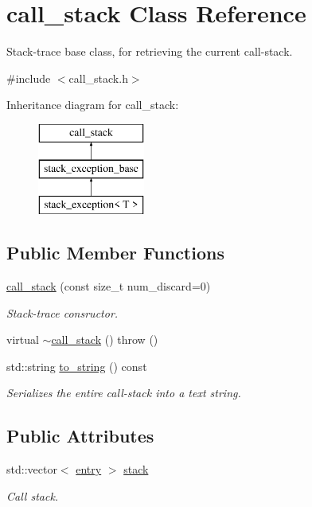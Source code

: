 \hypertarget{classstacktrace_1_1call__stack}{}\section{call\+\_\+stack Class Reference}
\label{classstacktrace_1_1call__stack}


Stack-\/trace base class, for retrieving the current call-\/stack.  




{\ttfamily \#include $<$call\+\_\+stack.\+h$>$}

Inheritance diagram for call\+\_\+stack\+:\begin{figure}[H]
\begin{center}
\leavevmode
\includegraphics[height=3.000000cm]{classstacktrace_1_1call__stack}
\end{center}
\end{figure}
\subsection*{Public Member Functions}
\begin{DoxyCompactItemize}
\item 
\mbox{\hyperlink{classstacktrace_1_1call__stack_a849ac898624b9ee9a0f6f385624243bb}{call\+\_\+stack}} (const size\+\_\+t num\+\_\+discard=0)
\begin{DoxyCompactList}\small\item\em Stack-\/trace consructor. \end{DoxyCompactList}\item 
virtual \mbox{\hyperlink{classstacktrace_1_1call__stack_ad3a052567d850f543c14edadad05a833}{$\sim$call\+\_\+stack}} ()  throw ()
\item 
std\+::string \mbox{\hyperlink{classstacktrace_1_1call__stack_aac993ecccd3d88aafefb6b8e3caa1dee}{to\+\_\+string}} () const
\begin{DoxyCompactList}\small\item\em Serializes the entire call-\/stack into a text string. \end{DoxyCompactList}\end{DoxyCompactItemize}
\subsection*{Public Attributes}
\begin{DoxyCompactItemize}
\item 
std\+::vector$<$ \mbox{\hyperlink{structstacktrace_1_1entry}{entry}} $>$ \mbox{\hyperlink{classstacktrace_1_1call__stack_a2a3ab0b5bb69cd4a275f3f344d3cc6cd}{stack}}
\begin{DoxyCompactList}\small\item\em Call stack. \end{DoxyCompactList}\end{DoxyCompactItemize}


